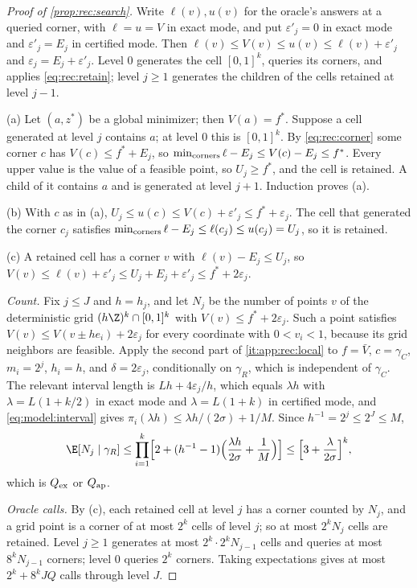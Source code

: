 \begin{proof}[Proof of \cref{prop:rec:search}]
Write $\ell(v),u(v)$ for the oracle's answers at a queried corner, with
$\ell=u=V$ in exact mode, and put $\varepsilon'_j=0$ in exact mode and
$\varepsilon'_j=E_j$ in certified mode. Then
$\ell(v)\le V(v)\le u(v)\le\ell(v)+\varepsilon'_j$ and
$\varepsilon_j=E_j+\varepsilon'_j$. Level $0$ generates the cell
$[0,1]^k$, queries its corners, and applies \eqref{eq:rec:retain}; level
$j\ge1$ generates the children of the cells retained at level $j-1$.

(a) Let $(a,z^*)$ be a global minimizer; then $V(a)=f^*$. Suppose a cell
generated at level $j$ contains $a$; at level $0$ this is $[0,1]^k$. By
\eqref{eq:rec:corner} some corner $c$ has $V(c)\le f^*+E_j$, so
$\min_{\rm corners}\ell-E_j\le V(c)-E_j\le f^*$. Every upper value is the
value of a feasible point, so $U_j\ge f^*$, and the cell is retained. A
child of it contains $a$ and is generated at level $j+1$. Induction proves
(a).

(b) With $c$ as in (a), $U_j\le u(c)\le V(c)+\varepsilon'_j\le
f^*+\varepsilon_j$. The cell that generated the corner $c_j$ satisfies
$\min_{\rm corners}\ell-E_j\le\ell(c_j)\le u(c_j)=U_j$, so it is retained.

(c) A retained cell has a corner $v$ with $\ell(v)-E_j\le U_j$, so
$V(v)\le\ell(v)+\varepsilon'_j\le U_j+E_j+\varepsilon'_j\le f^*+2\varepsilon_j$.

\emph{Count.} Fix $j\le J$ and $h=h_j$, and let $N_j$ be the number of
points $v$ of the deterministic grid $(h\Z)^k\cap[0,1]^k$ with
$V(v)\le f^*+2\varepsilon_j$. Such a point satisfies
$V(v)\le V(v\pm he_i)+2\varepsilon_j$ for every coordinate with $0<v_i<1$,
because its grid neighbors are feasible. Apply the second part of
\ref{it:app:rec:local} to $f=\bar V$, $c=\gamma_C$, $m_i=2^j$, $h_i=h$, and
$\delta=2\varepsilon_j$, conditionally on $\gamma_R$, which is independent of
$\gamma_C$. The relevant interval length is $Lh+4\varepsilon_j/h$, which equals
$\lambda h$ with $\lambda=L(1+k/2)$ in exact mode and $\lambda=L(1+k)$ in
certified mode, and \eqref{eq:model:interval} gives
$\pi_i(\lambda h)\le\lambda h/(2\sigma)+1/M$. Since $h^{-1}=2^j\le2^J\le M$,
\[
 \E[N_j\mid\gamma_R]\le\prod_{i=1}^k\Bigl[2+(h^{-1}-1)\Bigl(\frac{\lambda h}{2\sigma}
 +\frac1M\Bigr)\Bigr]\le\Bigl[3+\frac\lambda{2\sigma}\Bigr]^k,
\]
which is $Q_{\rm ex}$ or $Q_{\rm ap}$.

\emph{Oracle calls.} By (c), each retained cell at level $j$ has a corner
counted by $N_j$, and a grid point is a corner of at most $2^k$ cells of
level $j$; so at most $2^kN_j$ cells are retained. Level $j\ge1$ generates
at most $2^k\cdot2^kN_{j-1}$ cells and queries at most $8^kN_{j-1}$ corners;
level $0$ queries $2^k$ corners. Taking expectations gives at most
$2^k+8^kJQ$ calls through level $J$.
\end{proof}


